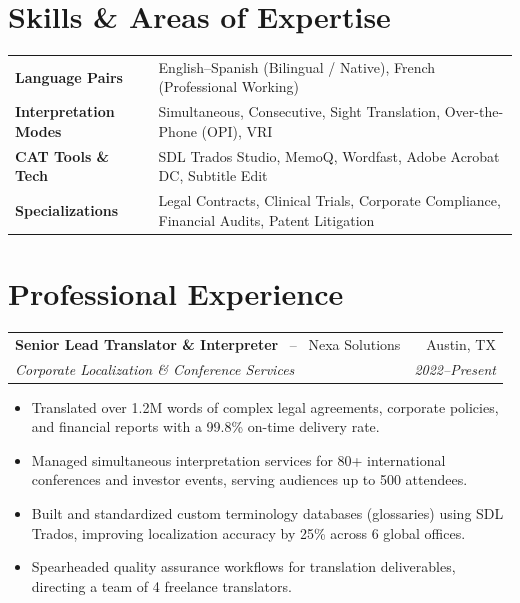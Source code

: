 \documentclass[10pt,letterpaper]{article}
\begin{document}
\section*{Skills \& Areas of Expertise}
\begin{tabularx}{\textwidth}{@{} l X @{}}
  \textbf{Language Pairs} & English--Spanish (Bilingual / Native), French (Professional Working) \\
  \textbf{Interpretation Modes} & Simultaneous, Consecutive, Sight Translation, Over-the-Phone (OPI), VRI \\
  \textbf{CAT Tools \& Tech} & SDL Trados Studio, MemoQ, Wordfast, Adobe Acrobat DC, Subtitle Edit \\
  \textbf{Specializations} & Legal Contracts, Clinical Trials, Corporate Compliance, Financial Audits, Patent Litigation \\
\end{tabularx}

\section*{Professional Experience}

\begin{tabularx}{\textwidth}{@{} X r @{}}
  \textbf{\color{primaryColor}Senior Lead Translator \& Interpreter} \ -- \ Nexa Solutions & Austin, TX \\
  \textit{Corporate Localization \& Conference Services} & \textit{2022--Present} \\
\end{tabularx}
\begin{itemize}
  \item Translated over 1.2M words of complex legal agreements, corporate policies, and financial reports with a 99.8\% on-time delivery rate.
  \item Managed simultaneous interpretation services for 80+ international conferences and investor events, serving audiences up to 500 attendees.
  \item Built and standardized custom terminology databases (glossaries) using SDL Trados, improving localization accuracy by 25\% across 6 global offices.
  \item Spearheaded quality assurance workflows for translation deliverables, directing a team of 4 freelance translators.
\end{itemize}

\vspace{6pt}
\end{document}
